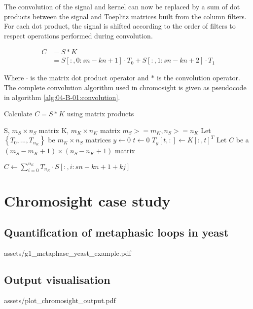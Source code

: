 The convolution of the signal and kernel can now be replaced by a sum of dot products between the signal and Toeplitz matrices built from the column filters. For each dot product, the signal is shifted according to the order of filters to respect operations performed during convolution.

\begin{align}
    C &= S * K \\
      &= S[:, 0: sn-kn+1] \cdot T_0 + S[:, 1:sn-kn+2] \cdot T_1
\end{align}

Where $\cdot$ is the matrix dot product operator and $*$ is the convolution operator.
The complete convolution algorithm used in chromosight is given as pseudocode in algorithm \ref{alg:04-B-01:convolution}.

\begin{algorithm}
\caption{Calculate $C = S * K$ using matrix products}
\label{alg:04-B-01:convolution}
\begin{algorithmic}
\REQUIRE S, $m_S \times n_S$ matrix
\REQUIRE K, $m_K \times n_K$ matrix
\ENSURE $m_S >= m_K, n_S >= n_K$
\STATE Let $\left\{T_0, ..., T_{n_K}\right\}$ be $m_K \times n_S$ matrices
\STATE $y \leftarrow 0$
    \STATE $t \leftarrow 0$
        \STATE $T_y[t, :] \leftarrow K[:, t]^T$
    \ENDWHILE
\ENDWHILE
\STATE Let $C$ be a $(m_S - m_K + 1) \times (n_S - n_K + 1)$ matrix

\STATE $C \leftarrow \sum_{i=0}^{n_K}{T_{n_K} \cdot S[: , i: sn-kn+1+kj]}$ 
\end{algorithmic}
\end{algorithm}


\chapter{Chromosight case study}
\label{ch:04-B:demo}

\section{Quantification of metaphasic loops in yeast}
 {assets/g1_metaphase_yeast_example.pdf}    

\section{Output visualisation}
 {assets/plot_chromosight_output.pdf}    